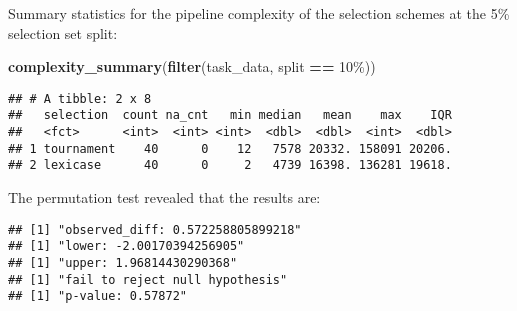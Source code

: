 \documentclass[
]{book}
\newenvironment{Shaded}{\begin{snugshade}}{\end{snugshade}}
\newcommand{\AttributeTok}[1]{\textcolor[rgb]{0.13,0.29,0.53}{#1}}
\newcommand{\DecValTok}[1]{\textcolor[rgb]{0.00,0.00,0.81}{#1}}
\newcommand{\FunctionTok}[1]{\textcolor[rgb]{0.13,0.29,0.53}{\textbf{#1}}}
\newcommand{\NormalTok}[1]{#1}
\newcommand{\OtherTok}[1]{\textcolor[rgb]{0.56,0.35,0.01}{#1}}
\newcommand{\SpecialCharTok}[1]{\textcolor[rgb]{0.81,0.36,0.00}{\textbf{#1}}}
\newcommand{\StringTok}[1]{\textcolor[rgb]{0.31,0.60,0.02}{#1}}
\begin{document}
Summary statistics for the pipeline complexity of the selection schemes at the 5\% selection set split:

\begin{Shaded}
\begin{Highlighting}[]
\FunctionTok{complexity\_summary}\NormalTok{(}\FunctionTok{filter}\NormalTok{(task\_data, split }\SpecialCharTok{==} \StringTok{\textquotesingle{}10\%\textquotesingle{}}\NormalTok{))}
\end{Highlighting}
\end{Shaded}

\begin{verbatim}
## # A tibble: 2 x 8
##   selection  count na_cnt   min median   mean    max    IQR
##   <fct>      <int>  <int> <int>  <dbl>  <dbl>  <int>  <dbl>
## 1 tournament    40      0    12   7578 20332. 158091 20206.
## 2 lexicase      40      0     2   4739 16398. 136281 19618.
\end{verbatim}

The permutation test revealed that the results are:

\begin{Shaded}
\end{Shaded}

\begin{verbatim}
## [1] "observed_diff: 0.572258805899218"
## [1] "lower: -2.00170394256905"
## [1] "upper: 1.96814430290368"
## [1] "fail to reject null hypothesis"
## [1] "p-value: 0.57872"
\end{verbatim}
\end{document}
